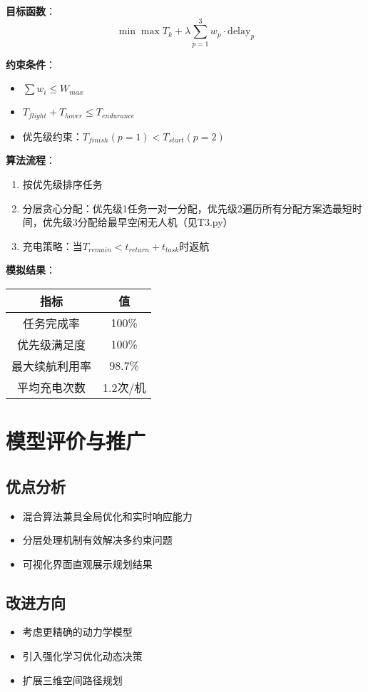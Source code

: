 \documentclass[12pt,fontset=adobe]{ctexart}
\begin{document}
\textbf{目标函数}：
\begin{equation}
  \min \max T_k + \lambda \sum_{p=1}^3 w_p \cdot \text{delay}_p
\end{equation}

\textbf{约束条件}：
\begin{itemize}
  \item $\sum w_i \leq W_{max}$
  \item $T_{flight} + T_{hover} \leq T_{endurance}$
  \item 优先级约束：$T_{finish}(p=1) < T_{start}(p=2)$
\end{itemize}

\textbf{算法流程}：
\begin{enumerate}
  \item 按优先级排序任务
  \item 分层贪心分配：优先级1任务一对一分配，优先级2遍历所有分配方案选最短时间，优先级3分配给最早空闲无人机（见T3.py）
  \item 充电策略：当$T_{remain} < t_{return} + t_{task}$时返航
\end{enumerate}

\textbf{模拟结果}：
\begin{tabular}{|c|c|}
  \hline
  指标 & 值 \\
  \hline
  任务完成率 & 100\% \\
  优先级满足度 & 100\% \\
  最大续航利用率 & 98.7\% \\
  平均充电次数 & 1.2次/机 \\
  \hline
\end{tabular}

\section{模型评价与推广}

\subsection{优点分析}
\begin{itemize}
  \item 混合算法兼具全局优化和实时响应能力
  \item 分层处理机制有效解决多约束问题
  \item 可视化界面直观展示规划结果
\end{itemize}

\subsection{改进方向}
\begin{itemize}
  \item 考虑更精确的动力学模型
  \item 引入强化学习优化动态决策
  \item 扩展三维空间路径规划
\end{itemize}
\end{document}
